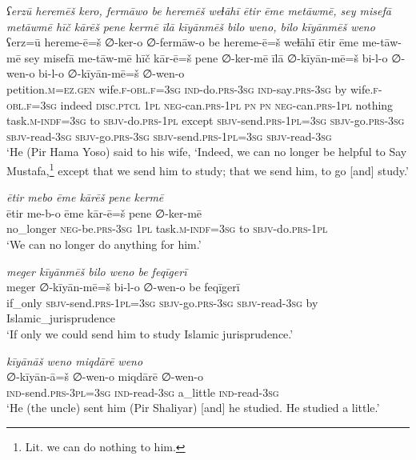 \ea \label{ŽP.72}
\textit{ʕerzū heremēš kero, fermāwo be heremēš weɫāhī ētir ēme metāwmē, sey misefā metāwmē hīč kārēš pene kermē īlā kīyānmēš bilo weno, bilo kīyānmēš weno} \\ 
\gll ʕerz=ū hereme-ē=š ∅-ker-o ∅-fermāw-o be hereme-ē=š weɫāhī ētir ēme me-tāw-mē sey misefā me-tāw-mē hīč kār-ē=š pene ∅-ker-mē īlā ∅-kīyān-mē=š bi-l-o ∅-wen-o bi-l-o ∅-kīyān-mē=š ∅-wen-o \\ 
 petition\textsc{.m}\textsc{\textsc{=ez.gen}} wife\textsc{.f}\textsc{-obl}\textsc{.f}\textsc{=3sg} \textsc{ind-}do\textsc{.prs}\textsc{-3sg} \textsc{ind-}say\textsc{.prs}\textsc{-3sg} by wife\textsc{.f}\textsc{-obl}\textsc{.f}\textsc{=3sg} indeed \textsc{disc.ptcl} \textsc{1pl} \textsc{neg-}can\textsc{.prs}\textsc{-1pl} \textsc{pn} \textsc{pn} \textsc{neg-}can\textsc{.prs}\textsc{-1pl} nothing task\textsc{.m}\textsc{-indf}\textsc{=3sg} to \textsc{sbjv-}do\textsc{.prs}\textsc{-1pl} except \textsc{sbjv-}send\textsc{.prs}\textsc{-1pl}\textsc{=3sg} \textsc{sbjv-}go\textsc{.prs}\textsc{-3sg} \textsc{sbjv-}read\textsc{-3sg} \textsc{sbjv-}go\textsc{.prs}\textsc{-3sg} \textsc{sbjv-}send\textsc{.prs}\textsc{-1pl}\textsc{=3sg} \textsc{sbjv-}read\textsc{-3sg} \\ 
\glt `He (Pir Hama Yoso) said to his wife, ‘Indeed, we can no longer be helpful to Say Mustafa,\footnote{Lit. we can do nothing to him.} except that we send him to study; that we send him, to go [and] study.'
\z 
 
\ea \label{ŽP.75}
\textit{ētir mebo ēme kārēš pene kermē} \\ 
\gll ētir me-b-o ēme kār-ē=š pene ∅-ker-mē \\ 
 no\_longer \textsc{neg-}be\textsc{.prs}\textsc{-3sg} \textsc{1pl} task\textsc{.m}\textsc{-indf}\textsc{=3sg} to \textsc{sbjv-}do\textsc{.prs}\textsc{-1pl} \\ 
\glt `We can no longer do anything for him.'
\z 
 
\ea \label{ŽP.78}
\textit{meger kīyānmēš bilo weno be feqīgerī} \\ 
\gll meger ∅-kīyān-mē=š bi-l-o ∅-wen-o be feqīgerī \\ 
 if\_only \textsc{sbjv-}send\textsc{.prs}\textsc{-1pl}\textsc{=3sg} \textsc{sbjv-}go\textsc{.prs}\textsc{-3sg} \textsc{sbjv-}read\textsc{-3sg} by Islamic\_jurisprudence \\ 
\glt `If only we could send him to study Islamic jurisprudence.'
\z 
 
\ea \label{ŽP.79}
\textit{kīyānāš weno miqdārē weno} \\ 
\gll ∅-kīyān-ā=š ∅-wen-o miqdārē ∅-wen-o \\ 
 \textsc{ind-}send\textsc{.prs}\textsc{-3pl}\textsc{=3sg} \textsc{ind-}read\textsc{-3sg} a\_little \textsc{ind-}read\textsc{-3sg} \\ 
\glt `He (the uncle) sent him (Pir Shaliyar) [and] he studied. He studied a little.'
\z 
 

